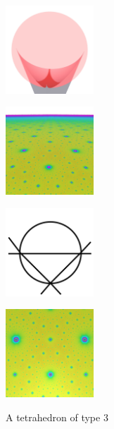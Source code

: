 \documentclass[suppldata, dvipdfmx]{interact}
\theoremstyle{plain}%
\theoremstyle{definition}
\theoremstyle{remark}
\theoremstyle{problemstyle}
\begin{document}
\begin{figure}[h!tbp]
  \begin{minipage}[t]{0.23\textwidth}
   \centering
   \includegraphics[width=1.3in,
   keepaspectratio]{./img/sphairahedron/tetrahedron/sphairahedralPrism_c.jpg}
   \subcaption{}
   \label{fig:tetrahedralPrism_c}
  \end{minipage}
  \hspace*{\fill}
  \begin{minipage}[t]{0.23\textwidth}
   \centering
   \includegraphics[width=1.3in, keepaspectratio]{./img/sphairahedron/tetrahedron/limitset_c.jpg}
   \subcaption{}
   \label{fig:tetrahedronLimitset_c}
  \end{minipage}
 \hspace*{\fill}
  \begin{minipage}[t]{0.23\textwidth}
   \centering
   \includegraphics[width=1.3in, keepaspectratio]{./img/HexahedraWithSphericalFaces/tetrahedron/slice_c.jpg}
   \subcaption{}
   \label{fig:tetrahedronSlice_c}
  \end{minipage}
 \hspace*{\fill}
  \begin{minipage}[t]{0.23\textwidth}
   \centering
   \includegraphics[width=1.3in, keepaspectratio]{./img/sphairahedron/tetrahedron/limitsetAbove_c.jpg}
   \subcaption{}
   \label{fig:tetrahedronAbove_c}
  \end{minipage}
 \hspace*{\fill}
 \caption{A tetrahedron of type 3}
 \label{fig:tetrahedronInf_c}
\end{figure}
\end{document}
